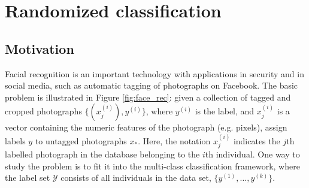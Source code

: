 
\chapter{Randomized classification} %

\label{Chapter2} %


\section{Motivation}

Facial recognition is an important technology with applications in
security and in social media, such as automatic tagging of photographs
on Facebook.  The basic problem is illustrated in Figure
\ref{fig:face_rec}: given a collection of tagged and cropped
photographs $\{(x_j^{(i)}), y^{(i)}\}$, where $y^{(i)}$ is the label,
and $x_j^{(i)}$ is a vector containing the numeric features of the
photograph (e.g. pixels), assign labels $y$ to untagged photographs
$x_*$.  Here, the notation $x_j^{(i)}$ indicates the $j$th labelled
photograph in the database belonging to the $i$th individual. One way
to study the problem is to fit it into the multi-class classification
framework, where the label set $\mathcal{Y}$ consists of all
individuals in the data set, $\{y^{(1)},\hdots, y^{(k)}\}$.

